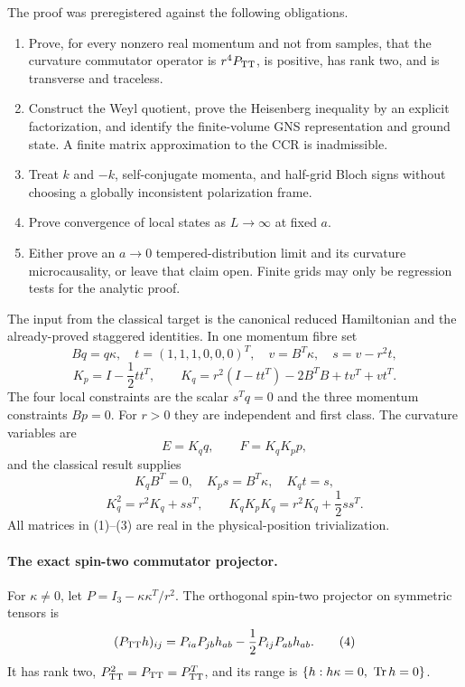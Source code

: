 The proof was preregistered against the following obligations.
\begin{enumerate}[label=\textbf{O\arabic*.},leftmargin=2.5em]
\item Prove, for every nonzero real momentum and not from samples, that the
curvature commutator operator is $r^4P_{\mathrm{TT}}$, is positive, has rank two, and
is transverse and traceless.
\item Construct the Weyl quotient, prove the Heisenberg inequality by an
explicit factorization, and identify the finite-volume GNS representation and
ground state.  A finite matrix approximation to the CCR is inadmissible.
\item Treat $k$ and $-k$, self-conjugate momenta, and half-grid Bloch signs
without choosing a globally inconsistent polarization frame.
\item Prove convergence of local states as $L\to\infty$ at fixed $a$.
\item Either prove an $a\to0$ tempered-distribution limit and its curvature
microcausality, or leave that claim open.  Finite grids may only be regression
tests for the analytic proof.
\end{enumerate}

The input from the classical target is the canonical reduced Hamiltonian and
the already-proved staggered identities.  In one momentum fibre set
\[
 Bq=q\kappa,\quad t=(1,1,1,0,0,0)^T,\quad
 v=B^T\kappa,\quad s=v-r^2t,
\]
\[
 K_p=I-\frac12tt^T,\qquad
 K_q=r^2(I-tt^T)-2B^TB+tv^T+vt^T.                 \tag{1}
\]
The four local constraints are the scalar $s^Tq=0$ and the three momentum
constraints $Bp=0$.  For $r>0$ they are independent and first class.  The
curvature variables are
\[
 E=K_qq,\qquad F=K_qK_pp,                           \tag{2}
\]
and the classical result supplies
\[
 K_qB^T=0,\quad K_ps=B^T\kappa,\quad K_qt=s,
\]
\[
 K_q^2=r^2K_q+ss^T,\qquad
 K_qK_pK_q=r^2K_q+\frac12ss^T.                    \tag{3}
\]
All matrices in (1)--(3) are real in the physical-position trivialization.

\paragraph{The exact spin-two commutator projector.}

For $\kappa\ne0$, let $P=I_3-\kappa\kappa^T/r^2$.  The orthogonal
spin-two projector on symmetric tensors is
\[
 (P_{\mathrm{TT}}h)_{ij}=P_{ia}P_{jb}h_{ab}
 -\frac12P_{ij}P_{ab}h_{ab}.                       \tag{4}
\]
It has rank two, $P_{\mathrm{TT}}^2=P_{\mathrm{TT}}=P_{\mathrm{TT}}^T$, and its range is
$\{h:h\kappa=0,\ \operatorname{Tr} h=0\}$.


